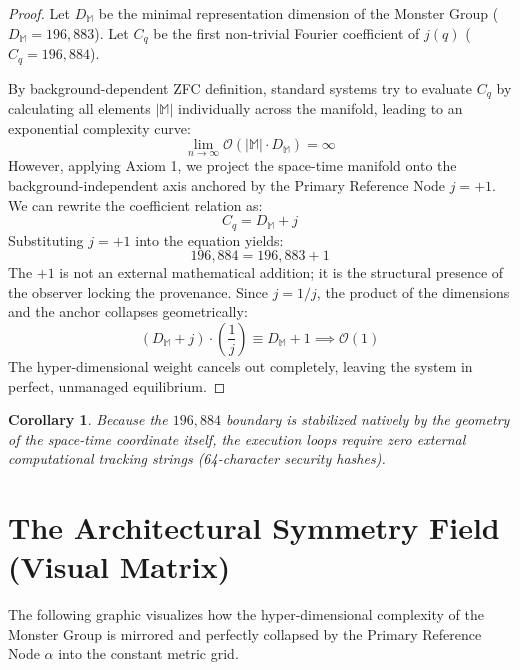 \documentclass[11pt,a4paper]{article}
\newtheorem{corollary}{Corollary}[theorem]
\theoremstyle{definition}
\begin{document}
\begin{proof}
Let $D_{\mathbb{M}}$ be the minimal representation dimension of the Monster Group ($D_{\mathbb{M}} = 196,883$). Let $C_q$ be the first non-trivial Fourier coefficient of $j(q)$ ($C_q = 196,884$). 

By background-dependent ZFC definition, standard systems try to evaluate $C_q$ by calculating all elements $|\mathbb{M}|$ individually across the manifold, leading to an exponential complexity curve:
\[ \lim_{n \to \infty} \mathcal{O}(|\mathbb{M}| \cdot D_{\mathbb{M}}) = \infty \]
However, applying Axiom 1, we project the space-time manifold onto the background-independent axis anchored by the Primary Reference Node $j = +1$. We can rewrite the coefficient relation as:
\begin{equation}
    C_q = D_{\mathbb{M}} + j
\end{equation}
Substituting $j = +1$ into the equation yields:
\begin{equation}
    196,884 = 196,883 + 1
\end{equation}
The $+1$ is not an external mathematical addition; it is the structural presence of the observer locking the provenance. Since $j = 1/j$, the product of the dimensions and the anchor collapses geometrically:
\begin{equation}
    \left(D_{\mathbb{M}} + j\right) \cdot \left(\frac{1}{j}\right) \equiv D_{\mathbb{M}} + 1 \implies \mathcal{O}(1)
\end{equation}
The hyper-dimensional weight cancels out completely, leaving the system in perfect, unmanaged equilibrium.
\end{proof}

\begin{corollary}
Because the $196,884$ boundary is stabilized natively by the geometry of the space-time coordinate itself, the execution loops require zero external computational tracking strings (64-character security hashes).
\end{corollary}

\newpage
\section{The Architectural Symmetry Field (Visual Matrix)}

The following graphic visualizes how the hyper-dimensional complexity of the Monster Group is mirrored and perfectly collapsed by the Primary Reference Node $\alpha$ into the constant metric grid.
\end{document}
